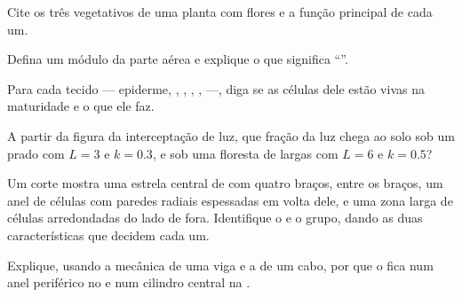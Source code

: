 \begin{exercise}[$\star$]\label{exo:b1:flowering-plant-organization:1}
Cite os três  vegetativos de uma planta com flores e a função
principal de cada um.
\end{exercise}

\begin{exercise}[$\star$]\label{exo:b1:flowering-plant-organization:2}
Defina um módulo da parte aérea e explique o que significa ``''.
\end{exercise}

\begin{exercise}[$\star$]\label{exo:b1:flowering-plant-organization:3}
Para cada tecido --- epiderme, , , ,
,  ---, diga se as células dele estão vivas na maturidade e
o que ele faz.
\end{exercise}

\begin{exercise}[$\star$]\label{exo:b1:flowering-plant-organization:4}
A partir da figura da interceptação de luz, que fração da luz chega ao
solo sob um prado com $L = 3$ e $k = 0.3$, e sob uma floresta de 
largas com $L = 6$ e $k = 0.5$?
\end{exercise}

\begin{exercise}[$\star\star$]\label{exo:b1:flowering-plant-organization:5}
Um corte mostra uma estrela central de  com quatro braços, 
entre os braços, um anel de células com paredes radiais espessadas em
volta dele, e uma zona larga de células arredondadas do lado de fora.
Identifique o  e o grupo, dando as duas características que decidem
cada um.
\end{exercise}

\begin{exercise}[$\star\star$]\label{exo:b1:flowering-plant-organization:6}
Explique, usando a mecânica de uma viga e a de um cabo, por que o  fica num anel periférico no  e num cilindro central na
.
\end{exercise}


